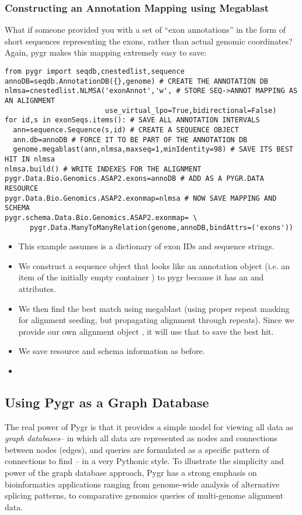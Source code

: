 \documentclass{howto}
\begin{document}
\subsubsection{Constructing an Annotation Mapping using Megablast}
What if someone provided you with a set of ``exon annotations'' in the form
of short sequences representing the exons, rather than actual genomic
coordinates?  Again, pygr makes this mapping extremely easy to save:
\begin{verbatim}
from pygr import seqdb,cnestedlist,sequence
annoDB=seqdb.AnnotationDB({},genome) # CREATE THE ANNOTATION DB
nlmsa=cnestedlist.NLMSA('exonAnnot','w', # STORE SEQ->ANNOT MAPPING AS AN ALIGNMENT
                        use_virtual_lpo=True,bidirectional=False)
for id,s in exonSeqs.items(): # SAVE ALL ANNOTATION INTERVALS
  ann=sequence.Sequence(s,id) # CREATE A SEQUENCE OBJECT
  ann.db=annoDB # FORCE IT TO BE PART OF THE ANNOTATION DB
  genome.megablast(ann,nlmsa,maxseq=1,minIdentity=98) # SAVE ITS BEST HIT IN nlmsa
nlmsa.build() # WRITE INDEXES FOR THE ALIGNMENT
pygr.Data.Bio.Genomics.ASAP2.exons=annoDB # ADD AS A PYGR.DATA RESOURCE
pygr.Data.Bio.Genomics.ASAP2.exonmap=nlmsa # NOW SAVE MAPPING AND SCHEMA
pygr.schema.Data.Bio.Genomics.ASAP2.exonmap= \
      pygr.Data.ManyToManyRelation(genome,annoDB,bindAttrs=('exons'))
\end{verbatim}

\begin{itemize}
\item This example assumes  is a dictionary of exon IDs and sequence
strings.

\item We construct a sequence object  that looks like an annotation
object (i.e. an item of the initially empty container \code{annoDB}) 
to pygr because it has an \code{id} and \code{db} attributes.

\item We then find the best match using megablast (using proper repeat masking
for alignment seeding, but propagating alignment through repeats).  Since we provide
our own alignment object \code{nlmsa}, it will use that to save the best hit.

\item We save resource and schema information as before.

\item
\end{itemize}

\subsection{Using Pygr as a Graph Database}
The real power of Pygr is that it provides a simple model for viewing
all data as {\em graph databases}-- in which all data are represented
as nodes and connections between nodes (edges), and queries are formulated
as a specific pattern of connections to find --
in a very Pythonic style.  To illustrate the simplicity and power
of the graph database approach, Pygr has a strong emphasis
on bioinformatics applications ranging from genome-wide analysis of
alternative splicing patterns, to comparative genomics queries of
multi-genome alignment data.
\end{document}
